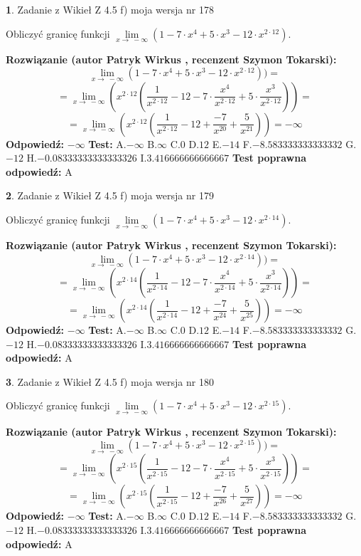 \documentclass[12pt, a4paper]{article}
\theoremstyle{definition} %
\newtheorem{zad}{}
\newcommand{\zadStart}[1]{\begin{zad}#1\newline}
\newcommand{\zadStop}{\end{zad}}
\newcommand{\rozwStart}[2]{\noindent \textbf{Rozwiązanie (autor #1 , recenzent #2): }\newline}
\newcommand{\rozwStop}{\newline}
\newcommand{\odpStart}{\noindent \textbf{Odpowiedź:}\newline}
\newcommand{\odpStop}{\newline}
\newcommand{\testStart}{\noindent \textbf{Test:}\newline}
\newcommand{\testStop}{\newline}
\newcommand{\kluczStart}{\noindent \textbf{Test poprawna odpowiedź:}\newline}
\newcommand{\kluczStop}{\newline}
\begin{document}
\zadStart{Zadanie z Wikieł Z 4.5 f) moja wersja nr 178}


Obliczyć granicę funkcji  $\lim\limits_{x\to\ -\infty}(1 - 7 \cdot x^{4}+5 \cdot x^{3}- 12 \cdot x^{2\cdot12})$.
\zadStop
\rozwStart{Patryk Wirkus}{Szymon Tokarski}
$$\lim\limits_{x\to\ -\infty}(1 - 7 \cdot x^{4}+5 \cdot x^{3}- 12 \cdot x^{2\cdot12}))=$$
$$=\lim\limits_{x\to\ -\infty}(x^{2\cdot12}(\frac{1}{x^{2\cdot12}}-12 -7 \cdot \frac{x^{4}}{x^{2\cdot12}}+5 \cdot \frac{x^{3}}{x^{2\cdot12}}))=$$
$$=\lim\limits_{x\to\ -\infty}(x^{2\cdot12}(\frac{1}{x^{2\cdot12}}-12 + \frac{-7}{x^{20}}+ \frac{5}{x^{21}}))=-\infty$$
\rozwStop
\odpStart
$-\infty$
\odpStop
\testStart
A.$-\infty$ B.$\infty$ C.$0$ D.$12$ E.$-14$
F.$-8.583333333333332$ G.$-12$
H.$-0.08333333333333326$
I.$3.416666666666667$
\testStop
\kluczStart
A
\kluczStop



\zadStart{Zadanie z Wikieł Z 4.5 f) moja wersja nr 179}


Obliczyć granicę funkcji  $\lim\limits_{x\to\ -\infty}(1 - 7 \cdot x^{4}+5 \cdot x^{3}- 12 \cdot x^{2\cdot14})$.
\zadStop
\rozwStart{Patryk Wirkus}{Szymon Tokarski}
$$\lim\limits_{x\to\ -\infty}(1 - 7 \cdot x^{4}+5 \cdot x^{3}- 12 \cdot x^{2\cdot14}))=$$
$$=\lim\limits_{x\to\ -\infty}(x^{2\cdot14}(\frac{1}{x^{2\cdot14}}-12 -7 \cdot \frac{x^{4}}{x^{2\cdot14}}+5 \cdot \frac{x^{3}}{x^{2\cdot14}}))=$$
$$=\lim\limits_{x\to\ -\infty}(x^{2\cdot14}(\frac{1}{x^{2\cdot14}}-12 + \frac{-7}{x^{24}}+ \frac{5}{x^{25}}))=-\infty$$
\rozwStop
\odpStart
$-\infty$
\odpStop
\testStart
A.$-\infty$ B.$\infty$ C.$0$ D.$12$ E.$-14$
F.$-8.583333333333332$ G.$-12$
H.$-0.08333333333333326$
I.$3.416666666666667$
\testStop
\kluczStart
A
\kluczStop



\zadStart{Zadanie z Wikieł Z 4.5 f) moja wersja nr 180}


Obliczyć granicę funkcji  $\lim\limits_{x\to\ -\infty}(1 - 7 \cdot x^{4}+5 \cdot x^{3}- 12 \cdot x^{2\cdot15})$.
\zadStop
\rozwStart{Patryk Wirkus}{Szymon Tokarski}
$$\lim\limits_{x\to\ -\infty}(1 - 7 \cdot x^{4}+5 \cdot x^{3}- 12 \cdot x^{2\cdot15}))=$$
$$=\lim\limits_{x\to\ -\infty}(x^{2\cdot15}(\frac{1}{x^{2\cdot15}}-12 -7 \cdot \frac{x^{4}}{x^{2\cdot15}}+5 \cdot \frac{x^{3}}{x^{2\cdot15}}))=$$
$$=\lim\limits_{x\to\ -\infty}(x^{2\cdot15}(\frac{1}{x^{2\cdot15}}-12 + \frac{-7}{x^{26}}+ \frac{5}{x^{27}}))=-\infty$$
\rozwStop
\odpStart
$-\infty$
\odpStop
\testStart
A.$-\infty$ B.$\infty$ C.$0$ D.$12$ E.$-14$
F.$-8.583333333333332$ G.$-12$
H.$-0.08333333333333326$
I.$3.416666666666667$
\testStop
\kluczStart
A
\kluczStop
\end{document}
